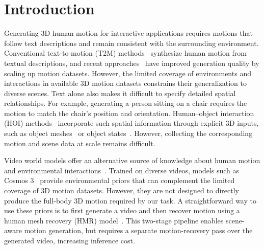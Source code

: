 \section{Introduction}
\label{sec:intro}
Generating 3D human motion for interactive applications requires motions that follow text descriptions and remain consistent with the surrounding environment. Conventional text-to-motion (T2M) methods~\citep{zhang2024motiondiffuse,tevet2023mdm} synthesize human motion from textual descriptions, and recent approaches~\citep{hymotion2025,Kimodo2026} have improved generation quality by scaling up motion datasets. However, the limited coverage of environments and interactions in available 3D motion datasets constrains their generalization to diverse scenes. Text alone also makes it difficult to specify detailed spatial relationships. For example, generating a person sitting on a chair requires the motion to match the chair's position and orientation. Human--object interaction (HOI) methods~\citep{li2024chois,jung2026dechoi} incorporate such spatial information through explicit 3D inputs, such as object meshes~\citep{kulkarni2024nifty} or object states~\citep{li2024chois,zhang2026giraf}. However, collecting the corresponding motion and scene data at scale remains difficult.

Video world models offer an alternative source of knowledge about human motion and environmental interactions~\citep{wan2025wan,minimaxh3}. Trained on diverse videos, models such as Cosmos 3~\citep{agarwal2026cosmos} provide environmental priors that can complement the limited coverage of 3D motion datasets. However, they are not designed to directly produce the full-body 3D motion required by our task. A straightforward way to use these priors is to first generate a video and then recover motion using a human mesh recovery (HMR) model~\citep{patel2025camerahmr,zhao2026onlinehmr}. This two-stage pipeline enables scene-aware motion generation, but requires a separate motion-recovery pass over the generated video, increasing inference cost.


